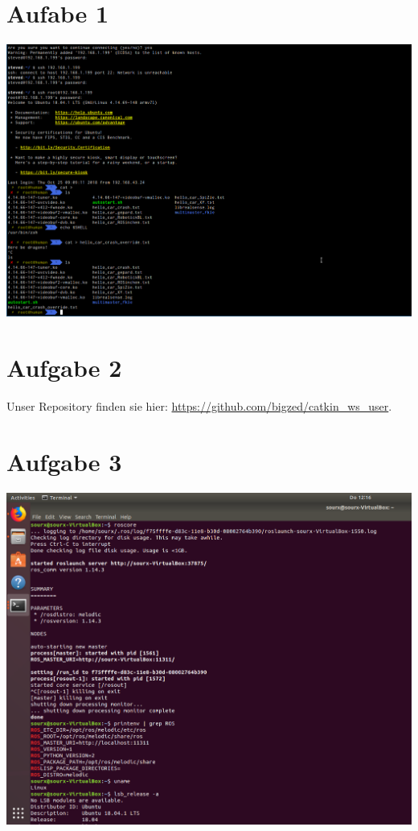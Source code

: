 \documentclass[10pt,oneside,a4paper]{article}
\begin{document}
  \section{Aufabe 1}
    \begin{center}
      \includegraphics[scale=0.3]{pictures/ssh_connect.png}
    \end{center}
  \section{Aufgabe 2}
    Unser Repository finden sie hier: \url{https://github.com/bigzed/catkin_ws_user}.
  \section{Aufgabe 3}
    \begin{center}
      \includegraphics[scale=0.3]{pictures/roscore.png}
    \end{center}
\end{document}
